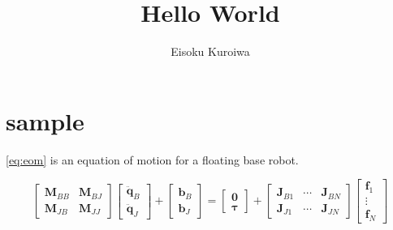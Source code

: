 \documentclass[a4paper, onecolumn, 10pt]{article}
\title{Hello World}
\author{Eisoku Kuroiwa}
\date{\Filemodtoday{\jobname}}
\begin{document}
\maketitle

\section{sample}
\autoref{eq:eom} is an equation of motion for a floating base robot.

\begin{equation}
  \begin{bmatrix}
    \bm{M}_{BB} & \bm{M}_{BJ}\\
    \bm{M}_{JB} & \bm{M}_{JJ}
  \end{bmatrix}
  \begin{bmatrix}
    \ddot{\bm{q}}_{B}\\
    \ddot{\bm{q}}_{J}
  \end{bmatrix}
  +
  \begin{bmatrix}
    \bm{b}_{B}\\
    \bm{b}_{J}
  \end{bmatrix}
  =
  \begin{bmatrix}
    \bm{0}\\
    \bm{\tau}
  \end{bmatrix}
  +
  \begin{bmatrix}
    \bm{J}_{B1} & \cdots & \bm{J}_{BN}\\
    \bm{J}_{J1} & \cdots & \bm{J}_{JN}
  \end{bmatrix}
  \begin{bmatrix}
    \bm{f}_1\\
    \vdots\\
    \bm{f}_N
  \end{bmatrix}
  \label{eq:eom}
\end{equation}
\end{document}
